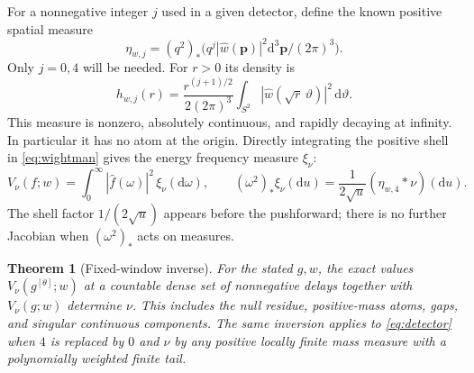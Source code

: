 \documentclass[11pt]{article}
\newtheorem{theorem}{Theorem}[section]
\theoremstyle{remark}
\newcommand{\dd}{\mathrm d}
\begin{document}
For a nonnegative integer \(j\) used in a given detector, define
the known positive spatial measure
\[
 \eta_{w,j}=(q^2)_*\bigl(q^j |\widehat w(\mathbf p)|^2
                              \dd^3\mathbf p/(2\pi)^3\bigr).
\]
Only \(j=0,4\) will be needed. For \(r>0\) its density is
\begin{equation}
 h_{w,j}(r)=\frac{r^{(j+1)/2}}{2(2\pi)^3}
          \int_{S^2}|\widehat w(\sqrt{r}\,\vartheta)|^2\,\dd\vartheta .
 \label{eq:spatialdensity}
\end{equation}
This measure is nonzero, absolutely continuous, and rapidly decaying
at infinity. In particular it has no atom at the origin.
Directly integrating the positive shell in \eqref{eq:wightman}
gives the energy frequency measure \(\xi_\nu\):
\begin{equation}
 V_\nu(f;w)=\int_0^\infty |\widehat f(\omega)|^2\,\xi_\nu(\dd\omega),
 \qquad
 (\omega^2)_*\xi_\nu(\dd u)=
       \frac{1}{2\sqrt u}(\eta_{w,4}*\nu)(\dd u).
 \label{eq:detector}
\end{equation}
The shell factor \(1/(2\sqrt u)\) appears before the pushforward;
there is no further Jacobian when \((\omega^2)_*\) acts on measures.

\begin{theorem}[Fixed-window inverse]
\label{thm:inverse}
For the stated \(g,w\), the exact values \(V_\nu(g^{[\theta]};w)\)
at a countable dense set of nonnegative delays together with
\(V_\nu(g;w)\) determine \(\nu\). This includes the null residue,
positive-mass atoms, gaps, and singular continuous components.
The same inversion applies to \eqref{eq:detector} when \(4\)
is replaced by \(0\) and \(\nu\) by any positive locally finite
mass measure with a polynomially weighted finite tail.
\end{theorem}
\end{document}

